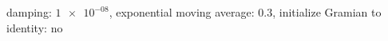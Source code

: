 damping: $\num[scientific-notation=true]{1e-08}$, exponential moving average: $\num[scientific-notation=true]{0.3}$, initialize Gramian to identity: $\text{no}$